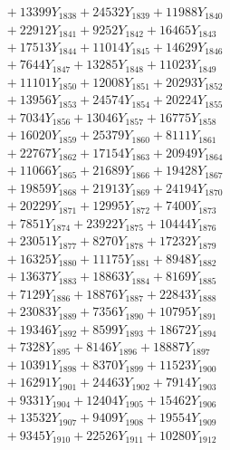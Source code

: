 \documentclass[a4paper,10pt]{article}
\begin{document}
{\begin{align}
&\;  + 13399 Y_{1838} + 24532 Y_{1839} + 11988 Y_{1840} \\[0.3ex]
&\;  + 22912 Y_{1841} + 9252 Y_{1842} + 16465 Y_{1843} \\[0.3ex]
&\;  + 17513 Y_{1844} + 11014 Y_{1845} + 14629 Y_{1846} \\[0.3ex]
&\;  + 7644 Y_{1847} + 13285 Y_{1848} + 11023 Y_{1849} \\[0.3ex]
&\;  + 11101 Y_{1850} + 12008 Y_{1851} + 20293 Y_{1852} \\[0.3ex]
&\;  + 13956 Y_{1853} + 24574 Y_{1854} + 20224 Y_{1855} \\[0.3ex]
&\;  + 7034 Y_{1856} + 13046 Y_{1857} + 16775 Y_{1858} \\[0.5ex]\allowbreak
&\;  + 16020 Y_{1859} + 25379 Y_{1860} + 8111 Y_{1861} \\[0.3ex]
&\;  + 22767 Y_{1862} + 17154 Y_{1863} + 20949 Y_{1864} \\[0.3ex]
&\;  + 11066 Y_{1865} + 21689 Y_{1866} + 19428 Y_{1867} \\[0.3ex]
&\;  + 19859 Y_{1868} + 21913 Y_{1869} + 24194 Y_{1870} \\[0.3ex]
&\;  + 20229 Y_{1871} + 12995 Y_{1872} + 7400 Y_{1873} \\[0.3ex]
&\;  + 7851 Y_{1874} + 23922 Y_{1875} + 10444 Y_{1876} \\[0.3ex]
&\;  + 23051 Y_{1877} + 8270 Y_{1878} + 17232 Y_{1879} \\[0.3ex]
&\;  + 16325 Y_{1880} + 11175 Y_{1881} + 8948 Y_{1882} \\[0.3ex]
&\;  + 13637 Y_{1883} + 18863 Y_{1884} + 8169 Y_{1885} \\[0.3ex]
&\;  + 7129 Y_{1886} + 18876 Y_{1887} + 22843 Y_{1888} \\[0.5ex]\allowbreak
&\;  + 23083 Y_{1889} + 7356 Y_{1890} + 10795 Y_{1891} \\[0.3ex]
&\;  + 19346 Y_{1892} + 8599 Y_{1893} + 18672 Y_{1894} \\[0.3ex]
&\;  + 7328 Y_{1895} + 8146 Y_{1896} + 18887 Y_{1897} \\[0.3ex]
&\;  + 10391 Y_{1898} + 8370 Y_{1899} + 11523 Y_{1900} \\[0.3ex]
&\;  + 16291 Y_{1901} + 24463 Y_{1902} + 7914 Y_{1903} \\[0.3ex]
&\;  + 9331 Y_{1904} + 12404 Y_{1905} + 15462 Y_{1906} \\[0.3ex]
&\;  + 13532 Y_{1907} + 9409 Y_{1908} + 19554 Y_{1909} \\[0.3ex]
&\;  + 9345 Y_{1910} + 22526 Y_{1911} + 10280 Y_{1912} \\[0.3ex]

\end{align}}
\end{document}
